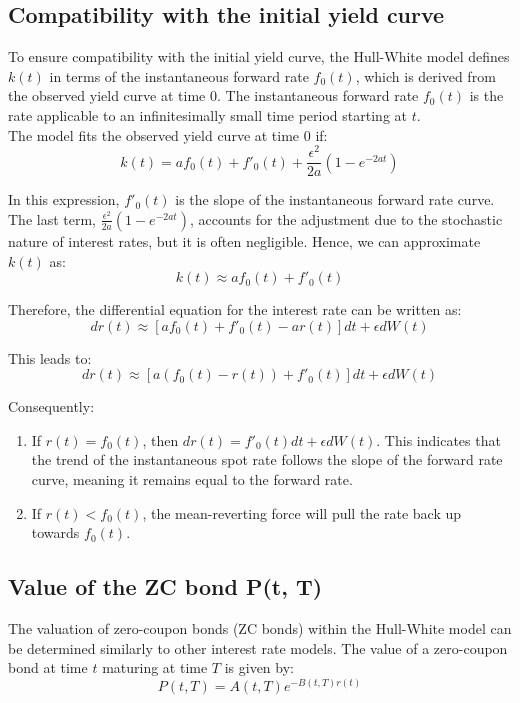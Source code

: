 \documentclass[a4paper,10pt]{article}
\begin{document}
\subsection{Compatibility with the initial yield curve}

\noindent To ensure compatibility with the initial yield curve, the Hull-White model defines \( k(t) \) in terms of the instantaneous forward rate \( f_0(t) \), which is derived from the observed yield curve at time 0. The instantaneous forward rate \( f_0(t) \) is the rate applicable to an infinitesimally small time period starting at \( t \). \\

\noindent The model fits the observed yield curve at time 0 if:
\[k(t) = af_0(t) + f'_0(t) + \frac{\epsilon^2}{2a}(1 - e^{-2at})\]

\noindent In this expression, \( f'_0(t) \) is the slope of the instantaneous forward rate curve. The last term, \(\frac{\epsilon^2}{2a}(1 - e^{-2at})\), accounts for the adjustment due to the stochastic nature of interest rates, but it is often negligible. Hence, we can approximate \( k(t) \) as:
\[k(t) \approx af_0(t) + f'_0(t)\]

\noindent Therefore, the differential equation for the interest rate can be written as:
\[dr(t) \approx [af_0(t) + f'_0(t) - ar(t)]dt + \epsilon dW(t)\]

\noindent This leads to:
\[dr(t) \approx [a(f_0(t) - r(t)) + f'_0(t)]dt + \epsilon dW(t)\]

\noindent Consequently:
\begin{enumerate}
    \item If \( r(t) = f_0(t) \), then \( dr(t) = f'_0(t)dt + \epsilon dW(t) \). This indicates that the trend of the instantaneous spot rate follows the slope of the forward rate curve, meaning it remains equal to the forward rate.
    \item If \( r(t) < f_0(t) \), the mean-reverting force will pull the rate back up towards \( f_0(t) \).
\end{enumerate}

\subsection{Value of the ZC bond P(t, T)}

\noindent The valuation of zero-coupon bonds (ZC bonds) within the Hull-White model can be determined similarly to other interest rate models. The value of a zero-coupon bond at time \( t \) maturing at time \( T \) is given by:
\[P(t, T) = A(t, T)e^{-B(t, T)r(t)}\]
\end{document}
